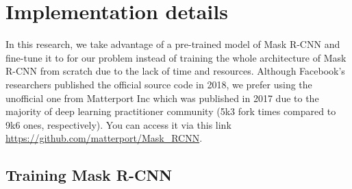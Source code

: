 \chapter{Implementation details}
\noindent

	In this research, we take advantage of a pre-trained model of Mask R-CNN and fine-tune it to for our problem instead of training the whole architecture of Mask R-CNN from scratch due to the lack of time and resources. Although Facebook's researchers published the official source code in 2018, we prefer using the unofficial one from Matterport Inc which was published in 2017 due to the majority of deep learning practitioner community (5k3 fork times compared to 9k6 ones, respectively). You can access it via this link \url{https://github.com/matterport/Mask_RCNN}.
	
\section{Training Mask R-CNN}
	
	
